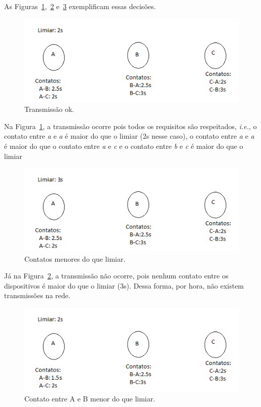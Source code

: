 \documentclass[11pt,a4paper,titlepage]{article}
\begin{document}
As Figuras~\ref{fig:ok1},~\ref{fig:nok1} e~\ref{fig:nok2} exemplificam essas decisões.

\begin{figure}
\centering
\includegraphics[]{images/ok1.png}
\caption{Transmissão ok.}
\label{fig:ok1}
\end{figure}

Na Figura~\ref{fig:ok1}, a transmissão ocorre pois todos os requisitos são respeitados, \textit{i.e.}, o contato entre \textit{a} e \textit{a} é maior do que o limiar (2s nesse caso), o contato entre \textit{a} e \textit{a} é maior do que o contato entre \textit{a} e \textit{c} e o contato entre \textit{b} e \textit{c} é maior do que o limiar

\begin{figure}
\centering
\includegraphics[]{images/nok1.png}
\caption{Contatos menores do que limiar.}
\label{fig:nok1}
\end{figure}

Já na Figura~\ref{fig:nok1}, a transmissão não ocorre, pois nenhum contato entre os dispositivos é maior do que o limiar (3s).
Dessa forma, por hora, não existem transmissões na rede.

\begin{figure}[h]
\centering
\includegraphics[]{images/nok2.png}
\caption{Contato entre A e B menor do que limiar.}
\label{fig:nok2}
\end{figure}
\end{document}
